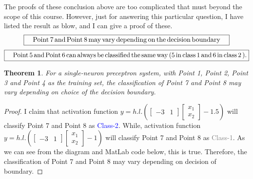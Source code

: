 \documentclass[12pt,letterpaper]{article}
\newtheorem{theorem}{Theorem}
\theoremstyle{definition}
\begin{document}
\begin{center}
\end{center}

The proofs of these conclusion above are too complicated that must beyond the scope of this course. However, just for answering this particular question, I have listed the result as blow, and I can give a proof of these.
\begin{equation}
    \boxed{\rm{\quad Point\,7 \, and\, Point\,8\,may\,vary\,depending\,on\,the\,decision\,boundary\quad}}
\end{equation}
\begin{equation}
    \boxed{\rm{\quad Point\,5 \, and\, Point\,6\,can\,always\,be\,classified\,the\,same\,way \,(5\,in\,class\,1\,and\,6\,in\,class\,2\,).}}
\end{equation}


\begin{theorem}
For a single-neuron preceptron system, with Point 1, Point 2, Point 3 and Point 4 as the training set, the classification of Point 7 and Point 8 may vary depending on choice of the decision boundary.
\end{theorem}
\begin{proof}
I claim that activation function $y = h.l.\left( {\left[ {\begin{array}{*{20}{c}}
-3&1
\end{array}} \right]\left[ {\begin{array}{*{20}{c}}
{{x_1}}\\
{{x_2}}
\end{array}} \right] - 1.5} \right)$ will classify Point 7 and Point 8 as \textcolor{blue}{Class-2}. While, activation function $y = h.l.\left( {\left[ {\begin{array}{*{20}{c}}
-3&1
\end{array}} \right]\left[ {\begin{array}{*{20}{c}}
{{x_1}}\\
{{x_2}}
\end{array}} \right] - 1} \right)$ will classify Point 7 and Point 8 as \textcolor{gray}{Class-1}. As we can see from the diagram and MatLab code below, this is true. Therefore, the classification of Point 7 and Point 8 may vary depending on decision of boundary.
\end{proof}
\end{document}
